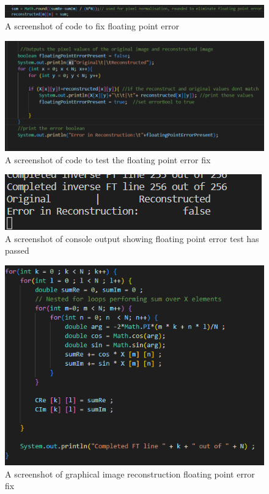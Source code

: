         \begin{figure}[H]
            \centering
            \includegraphics[width=1\columnwidth]{Figures/Week 1/W1-SimpleFT-InverseDFT-Floating-Point-Fix.png}
            \caption{A screenshot of code to fix floating point error}
            \label{fig:floating-Point-Fix}
        \end{figure}
        
    
        \begin{figure}[H]
            \centering
            \includegraphics[width=.49\columnwidth]{Figures/Week 1/W1-SimpleFT-InverseDFT-Test-2.0-code.png}
            \caption{A screenshot of code to test the floating point error fix}
            \label{fig:floating-Point-Fixed-test}
        \end{figure}
    
        \begin{figure}[H]
            \centering
            \includegraphics[width=0.8\columnwidth]{Figures/Week 1/W1-SimpleFT-InverseDFT-Test-2.0-CLI-Output.png}
            \caption{A screenshot of console output showing floating point error test has passed}
            \label{fig:floating-Point-Fixed-CLI-Output}
        \end{figure}
        
        \begin{figure}[H]
            \centering
            \includegraphics[width=0.8\columnwidth]{Figures/Week 1/W1-SimpleFT-Completed-For-Loop.png}
            \caption{A screenshot of graphical image reconstruction floating point error fix}
            \label{fig:floating-Point-Fixed-Graphical-Output}
        \end{figure}
    
